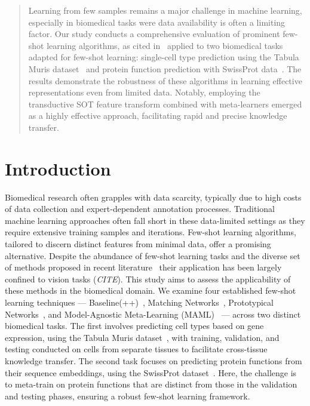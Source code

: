 \documentclass{article}
\begin{document}

\begin{abstract}
    Learning from few samples remains a major challenge in machine learning, especially in biomedical tasks were data availability is often a limiting factor. Our study conducts a comprehensive evaluation of prominent few-shot learning algorithms, as cited in~\cite{baseline, matchingnet, protonet, maml, sot} applied to two biomedical tasks  adapted for few-shot learning: single-cell type prediction using the Tabula Muris dataset~\cite{tabula2018} and protein function prediction with SwissProt data~\cite{uniprot2019}.
    The results demonstrate the robustness of these algorithms in learning effective representations even from limited data. Notably, employing the transductive SOT feature transform combined with meta-learners emerged as a highly effective approach, facilitating rapid and precise knowledge transfer.
\end{abstract}

\section{Introduction}

Biomedical research often grapples with data scarcity, typically due to high costs of data collection and expert-dependent annotation processes. Traditional machine learning approaches often fall short in these data-limited settings as they require extensive training samples and iterations. Few-shot learning algorithms, tailored to discern distinct features from minimal data, offer a promising alternative. Despite the abundance of few-shot learning tasks and the diverse set of methods proposed in recent literature~\cite{baseline, matchingnet, protonet, maml} their application has been largely confined to vision tasks (\textit{CITE}). This study aims to assess the applicability of these methods in the biomedical domain. We examine four established few-shot learning techniques — Baseline(++)~\cite{baseline}, Matching Networks~\cite{matchingnet}, Prototypical Networks~\cite{protonet}, and Model-Agnostic Meta-Learning (MAML)~\cite{maml} — across two distinct biomedical tasks. The first involves predicting cell types based on gene expression, using the Tabula Muris dataset~\cite{tabula2018}, with training, validation, and testing conducted on cells from separate tissues to facilitate cross-tissue knowledge transfer. The second task focuses on predicting protein functions from their sequence embeddings, using the SwissProt dataset~\cite{uniprot2019}. Here, the challenge is to meta-train on protein functions that are distinct from those in the validation and testing phases, ensuring a robust few-shot learning framework.
\end{document}
